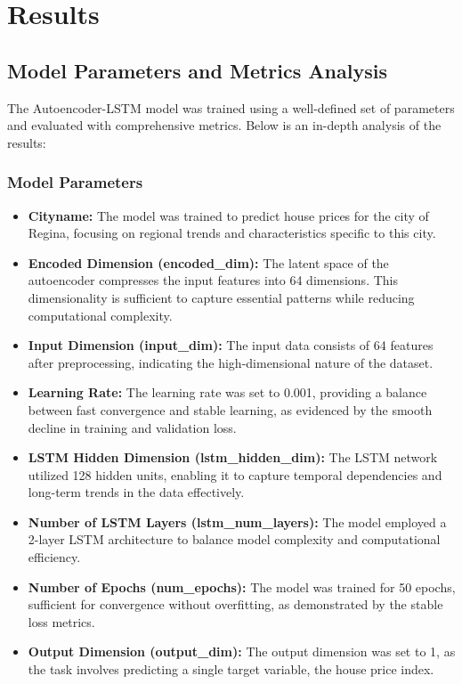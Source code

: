 \section{Results}

\subsection{Model Parameters and Metrics Analysis}

The Autoencoder-LSTM model was trained using a well-defined set of parameters and evaluated with comprehensive metrics. Below is an in-depth analysis of the results:

\subsubsection{Model Parameters}

\begin{itemize}
    \item \textbf{Cityname:} The model was trained to predict house prices for the city of Regina, focusing on regional trends and characteristics specific to this city.
    \item \textbf{Encoded Dimension (encoded\_dim):} The latent space of the autoencoder compresses the input features into 64 dimensions. This dimensionality is sufficient to capture essential patterns while reducing computational complexity.
    \item \textbf{Input Dimension (input\_dim):} The input data consists of 64 features after preprocessing, indicating the high-dimensional nature of the dataset.
    \item \textbf{Learning Rate:} The learning rate was set to 0.001, providing a balance between fast convergence and stable learning, as evidenced by the smooth decline in training and validation loss.
    \item \textbf{LSTM Hidden Dimension (lstm\_hidden\_dim):} The LSTM network utilized 128 hidden units, enabling it to capture temporal dependencies and long-term trends in the data effectively.
    \item \textbf{Number of LSTM Layers (lstm\_num\_layers):} The model employed a 2-layer LSTM architecture to balance model complexity and computational efficiency.
    \item \textbf{Number of Epochs (num\_epochs):} The model was trained for 50 epochs, sufficient for convergence without overfitting, as demonstrated by the stable loss metrics.
    \item \textbf{Output Dimension (output\_dim):} The output dimension was set to 1, as the task involves predicting a single target variable, the house price index.
\end{itemize}

